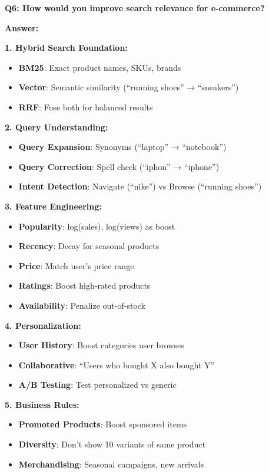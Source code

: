 \documentclass[10pt]{article}
\begin{document}
\textbf{Q6: How would you improve search relevance for e-commerce?}

\textbf{Answer:}

\textbf{1. Hybrid Search Foundation:}
\begin{itemize}
\item \textbf{BM25}: Exact product names, SKUs, brands
\item \textbf{Vector}: Semantic similarity (``running shoes'' → ``sneakers'')
\item \textbf{RRF}: Fuse both for balanced results
\end{itemize}

\textbf{2. Query Understanding:}
\begin{itemize}
\item \textbf{Query Expansion}: Synonyms (``laptop'' → ``notebook'')
\item \textbf{Query Correction}: Spell check (``iphon'' → ``iphone'')
\item \textbf{Intent Detection}: Navigate (``nike'') vs Browse (``running shoes'')
\end{itemize}

\textbf{3. Feature Engineering:}
\begin{itemize}
\item \textbf{Popularity}: log(sales), log(views) as boost
\item \textbf{Recency}: Decay for seasonal products
\item \textbf{Price}: Match user's price range
\item \textbf{Ratings}: Boost high-rated products
\item \textbf{Availability}: Penalize out-of-stock
\end{itemize}

\textbf{4. Personalization:}
\begin{itemize}
\item \textbf{User History}: Boost categories user browses
\item \textbf{Collaborative}: ``Users who bought X also bought Y''
\item \textbf{A/B Testing}: Test personalized vs generic
\end{itemize}

\textbf{5. Business Rules:}
\begin{itemize}
\item \textbf{Promoted Products}: Boost sponsored items
\item \textbf{Diversity}: Don't show 10 variants of same product
\item \textbf{Merchandising}: Seasonal campaigns, new arrivals
\end{itemize}
\end{document}
